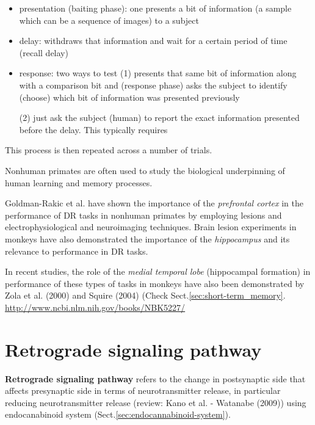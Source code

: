 \begin{itemize}
  \item presentation (baiting phase): one presents a bit of information (a
  sample which can be a sequence of images) to a subject
  
  \item delay: withdraws that information and wait for a certain period of time
  (recall
  delay)
  
  \item response: two ways to test
  (1) presents that same bit of information along with a comparison bit
  and (response phase) asks the subject to identify (choose) which bit of
  information was presented previously
  
  (2) just ask the subject (human) to report the exact information presented
  before the delay. This typically requires 
\end{itemize}
This process is then repeated across a  number of trials.

Nonhuman primates are often used to study the biological underpinning of human
learning and memory processes.

Goldman-Rakic et al. have shown the importance of the {\it prefrontal cortex}
in the performance of DR tasks in nonhuman primates by employing lesions and
electrophysiological and neuroimaging techniques.
Brain lesion experiments in monkeys have also demonstrated the importance of
the {\it hippocampus} and its relevance to performance in DR tasks.

In recent studies, the role of the {\it medial temporal lobe} (hippocampal
formation) in performance of these types of tasks in monkeys have also been
demonstrated by Zola et al. (2000) and Squire (2004) (Check
Sect.\ref{sec:short-term_memory}.
\url{http://www.ncbi.nlm.nih.gov/books/NBK5227/}
  
\section{Retrograde signaling pathway}
\label{sec:retrograde-signaling-pathway}
\label{sec:retrograde-endocannabinoid-pathway}
\label{sec:DSI}
\label{sec:DSE}

{\bf Retrograde signaling pathway} refers to the change in postsynaptic side
that affects presynaptic side in terms of neurotransmitter release, in
particular reducing neurotransmitter release (review: Kano et al.
- Watanabe (2009)) using endocanabinoid system
(Sect.\ref{sec:endocannabinoid-system}).


